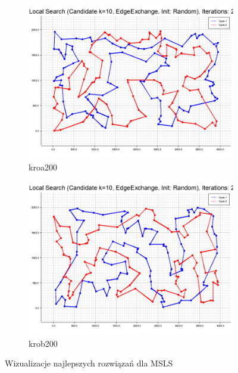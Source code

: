\documentclass[12pt,a4paper]{article}
\begin{document}
\begin{figure}[H]
\begin{adjustwidth}{-1cm}{-1cm} %
    \centering
    \begin{subfigure}[b]{0.5\textwidth}
        \centering
        \includegraphics[width=\textwidth]{figures/kroa200_MSLS_Base_Local_Search_Candidate_k_10_EdgeExchange_Init_Random__Iterations_200_.png}
        \caption{kroa200}
    \end{subfigure}%
    \hfill
    \begin{subfigure}[b]{0.5\textwidth}
        \centering
        \includegraphics[width=\textwidth]{figures/krob200_MSLS_Base_Local_Search_Candidate_k_10_EdgeExchange_Init_Random__Iterations_200_.png}
        \caption{krob200}
    \end{subfigure}
    \caption{Wizualizacje najlepszych rozwiązań dla MSLS}
    \label{fig:msls}
\end{adjustwidth}
\end{figure}
\end{document}

